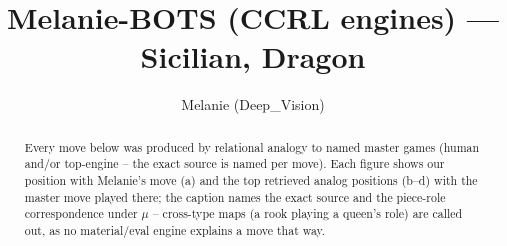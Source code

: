 \documentclass[11pt]{article}
\title{Melanie-BOTS (CCRL engines) — Sicilian, Dragon}
\author{Melanie (Deep\_Vision)}
\date{}
\begin{document}
\maketitle

\begin{abstract}Every move below was produced by relational analogy to named master games (human and/or top-engine -- the exact source is named per move). Each figure shows our position with Melanie's move (a) and the top retrieved analog positions (b--d) with the master move played there; the caption names the exact source and the piece-role correspondence under $\mu$ -- cross-type maps (a rook playing a queen's role) are called out, as no material/eval engine explains a move that way.\end{abstract}

\begin{figure}[p]\centering
\begin{subfigure}{0.46\textwidth}\centering
\resizebox{\linewidth}{!}{%
\newchessgame
\chessboard[
  setfen={rnbqk2r/pp2ppbp/3pNnp1/8/4P3/2N1B3/PPP2PPP/R2QKB1R b KQkq - 3 7},
  showmover=false,
  pgfstyle=straightmove, color=movearrow, markmove={f7-e6}
]}
\caption{}
\end{subfigure}\hfill
\begin{subfigure}{0.46\textwidth}\centering
\resizebox{\linewidth}{!}{%
\newchessgame
\chessboard[
  setfen={r1bqk2r/1p2bppp/p1Nppn2/8/4P3/1BN1B3/PPP2PPP/R2QK2R b KQkq - 0 9},
  showmover=false,
  pgfstyle=straightmove, color=movearrow, markmove={b7-c6}
]}
\caption{}
\end{subfigure}
\\[4pt]
\begin{subfigure}{0.46\textwidth}\centering
\resizebox{\linewidth}{!}{%
\newchessgame
\chessboard[
  setfen={r1bqk2r/1p2bppp/p1Nppn2/8/4P3/1BN1B3/PPP2PPP/R2QK2R b KQkq - 0 9},
  showmover=false,
  pgfstyle=straightmove, color=movearrow, markmove={b7-c6}
]}
\caption{}
\end{subfigure}\hfill
\begin{subfigure}{0.46\textwidth}\centering
\resizebox{\linewidth}{!}{%
\newchessgame
\chessboard[
  setfen={r1bqkb1r/1p2pppp/p1Np1n2/6B1/4P3/2N5/PPP2PPP/R2QKB1R b KQkq - 0 7},
  showmover=false,
  pgfstyle=straightmove, color=movearrow, markmove={b7-c6}
]}
\caption{}
\end{subfigure}

\end{figure}
\end{document}

